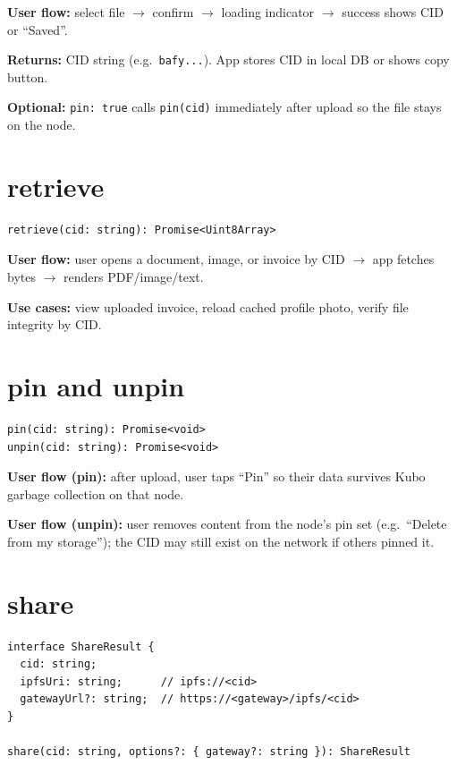 \documentclass[11pt,a4paper,openany]{report}
\begin{document}
\textbf{User flow:} select file $\rightarrow$ confirm $\rightarrow$ loading indicator $\rightarrow$ success shows CID or ``Saved''.

\textbf{Returns:} CID string (e.g.\ \texttt{bafy...}). App stores CID in local DB or shows copy button.

\textbf{Optional:} \texttt{pin: true} calls \texttt{pin(cid)} immediately after upload so the file stays on the node.

\section{retrieve}

\begin{lstlisting}
retrieve(cid: string): Promise<Uint8Array>
\end{lstlisting}

\textbf{User flow:} user opens a document, image, or invoice by CID $\rightarrow$ app fetches bytes $\rightarrow$ renders PDF/image/text.

\textbf{Use cases:} view uploaded invoice, reload cached profile photo, verify file integrity by CID.

\section{pin and unpin}

\begin{lstlisting}
pin(cid: string): Promise<void>
unpin(cid: string): Promise<void>
\end{lstlisting}

\textbf{User flow (pin):} after upload, user taps ``Pin'' so their data survives Kubo garbage collection on that node.

\textbf{User flow (unpin):} user removes content from the node's pin set (e.g.\ ``Delete from my storage''); the CID may still exist on the network if others pinned it.

\section{share}

\begin{lstlisting}
interface ShareResult {
  cid: string;
  ipfsUri: string;      // ipfs://<cid>
  gatewayUrl?: string;  // https://<gateway>/ipfs/<cid>
}

share(cid: string, options?: { gateway?: string }): ShareResult
\end{lstlisting}
\end{document}
